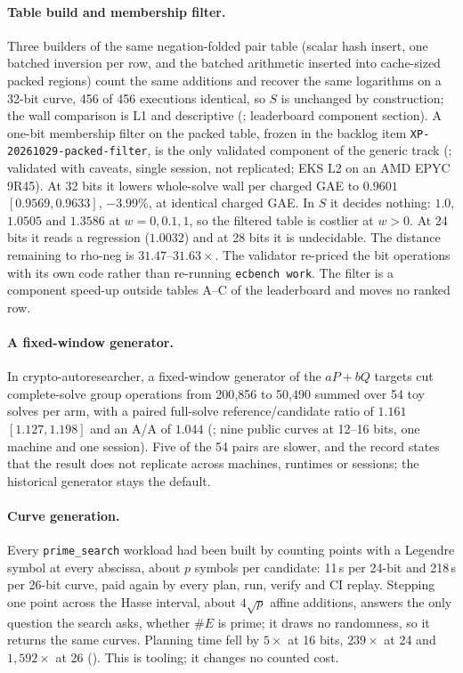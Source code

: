 \paragraph{Table build and membership filter.} Three builders of the same
negation-folded pair table (scalar hash insert, one batched inversion per
row, and the batched arithmetic inserted into cache-sized packed regions)
count the same additions and recover the same logarithms on a 32-bit
curve, 456 of 456 executions identical, so $S$ is unchanged by
construction; the wall comparison is L1 and descriptive
(; leaderboard component
section). A one-bit membership filter on the packed table, frozen in the
backlog item \texttt{XP-20261029-packed-filter}, is the only validated
component of the generic track (;
validated with caveats, single session, not replicated; EKS L2 on an AMD
EPYC 9R45). At 32 bits it lowers whole-solve wall per charged GAE to $0.9601$
$[0.9569,0.9633]$, $-3.99\%$, at identical charged GAE. In $S$ it decides
nothing: $1.0$, $1.0505$ and $1.3586$ at $w=0,0.1,1$, so the filtered table
is costlier at $w>0$. At 24 bits it reads a regression ($1.0032$) and at 28
bits it is undecidable. The distance remaining to rho-neg is $31.47$--$31.63\times$.
The validator re-priced the bit operations with its own code rather than
re-running \texttt{ecbench work}. The filter is a component speed-up outside
tables A--C of the leaderboard and moves no ranked row.

\paragraph{A fixed-window generator.} In crypto-autoresearcher, a
fixed-window generator of the $aP+bQ$ targets cut complete-solve group
operations from 200{,}856 to 50{,}490 summed over 54 toy solves per arm, with
a paired full-solve reference/candidate ratio of $1.161$ $[1.127,1.198]$ and
an A/A of $1.044$ (;
nine public curves at 12--16 bits, one machine and one session). Five of the
54 pairs are slower, and the record states that the result does not
replicate across machines, runtimes or sessions; the historical generator
stays the default.

\paragraph{Curve generation.} Every \texttt{prime\_search} workload had
been built by counting points with a Legendre symbol at every abscissa, about
$p$ symbols per candidate: 11\,s per 24-bit and 218\,s per 26-bit curve, paid
again by every plan, run, verify and CI replay. Stepping one point across the
Hasse interval, about $4\sqrt p$ affine additions, answers the only question
the search asks, whether $\#E$ is prime; it draws no randomness, so it
returns the same curves. Planning time fell by $5\times$ at 16 bits,
$239\times$ at 24 and $1{,}592\times$ at 26
(). This is tooling; it changes no
counted cost.

